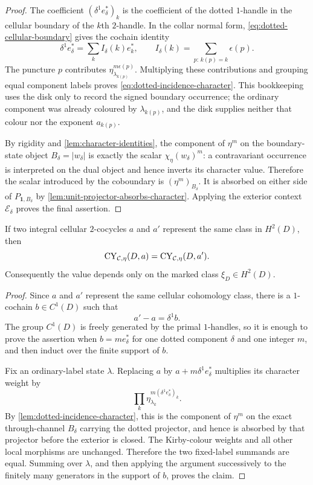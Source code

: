 \begin{proof}
The coefficient $(\delta^1e_\delta^*)_k$ is the coefficient of the dotted
$1$-handle in the cellular boundary of the $k$th $2$-handle.  In the collar
normal form, \eqref{eq:dotted-cellular-boundary} gives the cochain identity
\[
  \delta^1e_\delta^*=\sum_k I_\delta(k)e_k^*,
  \qquad
  I_\delta(k)=\sum_{p:\,k(p)=k}\epsilon(p).
\]
The puncture $p$ contributes
$\eta_{\lambda_{k(p)}}^{m\epsilon(p)}$.  Multiplying these contributions and
grouping equal component labels proves
\eqref{eq:dotted-incidence-character}.  This bookkeeping uses the disk only
to record the signed boundary occurrence; the ordinary component was already
coloured by $\lambda_{k(p)}$, and the disk supplies neither that colour nor
the exponent $a_{k(p)}$.

By rigidity and \cref{lem:character-identities}, the component of $\eta^m$
on the boundary-state object $B_\delta=|w_\delta|$ is exactly the scalar
$\chi_\eta(w_\delta)^m$: a contravariant occurrence is interpreted on the
dual object and hence inverts its character value.  Therefore the scalar
introduced by the coboundary is $(\eta^m)_{B_\delta}$.  It is absorbed on
either side of $P_{\mathbf1,B_\delta}$ by
\cref{lem:unit-projector-absorbs-character}.  Applying the exterior context
$\mathcal E_\delta$ proves the final assertion.
\end{proof}

\begin{proposition}
\label{prop:representative-independence}
If two integral cellular $2$-cocycles $a$ and $a'$ represent the same class
in $H^2(D)$, then
\[
  \operatorname{CY}_{\mathcal{C},\eta}(D,a)=\operatorname{CY}_{\mathcal{C},\eta}(D,a').
\]
Consequently the value depends only on the marked class
$\xi_D\in H^2(D)$.
\end{proposition}

\begin{proof}
Since $a$ and $a'$ represent the same cellular cohomology class, there is a
$1$-cochain $b\in C^1(D)$ such that
\[
  a'-a=\delta^1b.
\]
The group $C^1(D)$ is freely generated by the primal $1$-handles, so it is
enough to prove the assertion when $b=m e^*_{\delta}$ for one dotted
component $\delta$ and one integer $m$, and then induct over the finite
support of $b$.

Fix an ordinary-label state $\lambda$.  Replacing $a$ by
$a+m\delta^1e_\delta^*$ multiplies its character weight by
\[
  \prod_k\eta_{\lambda_k}^{m(\delta^1e_\delta^*)_k}.
\]
By \cref{lem:dotted-incidence-character}, this is the component of $\eta^m$
on the exact through-channel $B_\delta$ carrying the dotted projector, and
hence is absorbed by that projector before the exterior is closed.  The
Kirby-colour weights and all other local morphisms are
unchanged.  Therefore the two fixed-label summands are equal.  Summing over
$\lambda$, and then applying the argument successively to the finitely many
generators in the support of $b$, proves the claim.
\end{proof}


